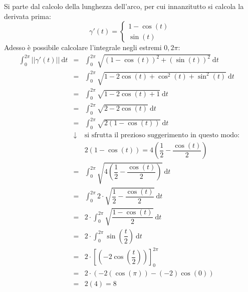 \documentclass[a4paper]{article}
\begin{document}
	\noindent
	Si parte dal calcolo della lunghezza dell'arco, per cui innanzitutto si calcola la derivata prima:
	\begin{equation*}
		\gamma'\left(t\right) = \begin{cases}
			1 - \cos\left(t\right) \\
			\sin\left(t\right)
		\end{cases}
	\end{equation*}
	Adesso è possibile calcolare l'integrale negli estremi $0,2\pi$:
	\begin{equation*}
		\begin{array}{rcl}
			\displaystyle\int_{0}^{2\pi} \left|\left| \gamma'\left(t\right) \right|\right| \:\mathrm{d}t 
			&=& 
			\displaystyle\int_{0}^{2\pi} \sqrt{\left(1-\cos\left(t\right)\right)^{2} + \left(\sin\left(t\right)\right)^{2}} \:\mathrm{d}t \\ [1em]
			&=&
			\displaystyle\int_{0}^{2\pi} \sqrt{1 - 2\cos\left(t\right) + \cos^{2}\left(t\right) + \sin^{2}\left(t\right)} \:\mathrm{d}t \\ [1em]
			&=&
			\displaystyle\int_{0}^{2\pi} \sqrt{1 - 2\cos\left(t\right) + 1} \:\mathrm{d}t \\ [1em]
			&=&
			\displaystyle\int_{0}^{2\pi} \sqrt{2 - 2\cos\left(t\right)} \:\mathrm{d}t \\ [1em]
			&=&
			\displaystyle\int_{0}^{2\pi} \sqrt{2\left(1 - \cos\left(t\right)\right)} \:\mathrm{d}t \\ [1em]
			&\downarrow& \text{si sfrutta il prezioso suggerimento in questo modo: } \\ [.3em] 
			&& 2\left(1-\cos\left(t\right)\right) = 4\left(\dfrac{1}{2} - \dfrac{\cos\left(t\right)}{2}\right) \\ [1em]
			&=&
			\displaystyle\int_{0}^{2\pi} \sqrt{4\left(\dfrac{1}{2} - \dfrac{\cos\left(t\right)}{2}\right)} \:\mathrm{d}t \\ [1.5em]
			&=&
			\displaystyle\int_{0}^{2\pi} 2 \cdot \sqrt{\dfrac{1}{2} - \dfrac{\cos\left(t\right)}{2}} \:\mathrm{d}t \\ [1.5em]
			&=&
			2 \cdot \displaystyle\int_{0}^{2\pi} \sqrt{\dfrac{1 - \cos\left(t\right)}{2}} \:\mathrm{d}t \\ [1.5em]
			&=&
			2 \cdot \displaystyle\int_{0}^{2\pi} \sin\left(\dfrac{t}{2}\right) \:\mathrm{d}t \\ [1.2em]
			&=&
			2 \cdot \left[\left(-2\cos\left(\dfrac{t}{2}\right)\right)\right]_{0}^{2\pi} \\ [1em]
			&=&
			2 \cdot \left(-2\left(\cos\left(\pi\right)\right) - \left(-2\right)\cos\left(0\right)\right) \\ [.3em]
			&=& 2 \left(4\right) = 8
		\end{array}
	\end{equation*}
\end{document}
